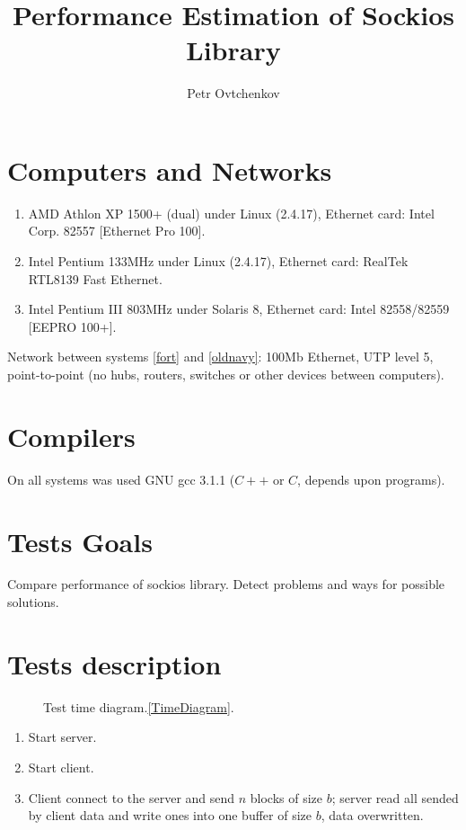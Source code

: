 \documentclass[a4paper]{article}
\title{Performance Estimation of Sockios Library}
\author{Petr Ovtchenkov}
\begin{document}
\maketitle

\section{Computers and Networks}

\begin{enumerate}
  \item AMD Athlon XP 1500+ (dual) under Linux (2.4.17),
        Ethernet card: Intel Corp. 82557 [Ethernet Pro 100].\label{fort}
  \item Intel Pentium 133MHz under Linux (2.4.17),
        Ethernet card: RealTek RTL8139 Fast Ethernet.\label{oldnavy}
  \item Intel Pentium III 803MHz under Solaris 8,
        Ethernet card: Intel 82558/82559 [EEPRO 100+].\label{ermine}
\end{enumerate}

Network between systems \ref{fort} and \ref{oldnavy}: 100Mb Ethernet,
UTP level 5, point-to-point (no hubs, routers,
switches or other devices between computers).

\section{Compilers}

On all systems was used GNU gcc 3{.}1{.}1 ($C{+}{+}$ or $C$, depends
upon programs).

\section{Tests Goals}

Compare performance of sockios library. Detect problems and ways for
possible solutions.

\section{Tests description}

\begin{figure}
  \begin{center}
  \end{center}
  \caption{Test time diagram.\ref{TimeDiagram}.}
\end{figure}

\begin{enumerate}
  \item Start server.
  \item Start client.
  \item Client connect to the server and send $n$ blocks of size $b$;
        server read all sended by client data and write ones into one
        buffer of size $b$, data overwritten.
\end{enumerate}
\end{document}
